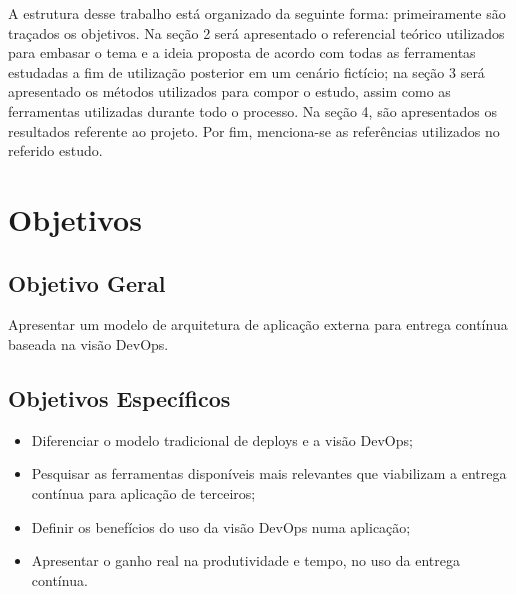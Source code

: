 A estrutura desse trabalho está organizado da seguinte forma: primeiramente são traçados os objetivos. Na seção 2 será apresentado o referencial teórico utilizados para embasar o tema e a ideia proposta de acordo com todas as ferramentas estudadas a fim de utilização posterior em um cenário fictício; na seção 3 será apresentado os métodos utilizados para compor o estudo, assim como as ferramentas utilizadas durante todo o processo. Na seção 4, são apresentados os resultados referente ao projeto. Por fim, menciona-se as referências utilizados no referido estudo.

\section{Objetivos}
\subsection{Objetivo Geral }
Apresentar um modelo de arquitetura de aplicação externa para entrega contínua baseada na visão DevOps.

\begin{comment}
Este é um comentário
\end{comment}

\subsection{Objetivos Específicos}
\begin{itemize}
	
\item Diferenciar o modelo tradicional de deploys e a visão DevOps;

\item Pesquisar as ferramentas disponíveis mais relevantes que viabilizam a entrega contínua para aplicação de terceiros;

\item Definir os benefícios do uso da visão DevOps numa aplicação;

\item Apresentar o ganho real na produtividade e tempo, no uso da entrega contínua.

\end{itemize}
